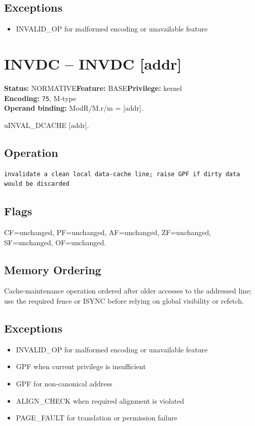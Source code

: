 \documentclass[10pt]{article}
\begin{document}
\subsection*{Exceptions}
\begin{itemize}
\item INVALID\_OP for malformed encoding or unavailable feature
\end{itemize}
\clearpage

\section{INVDC -- INVDC [addr]}
\textbf{Status:} NORMATIVE\quad \textbf{Feature:} BASE\quad \textbf{Privilege:} kernel\\
\textbf{Encoding:} \texttt{75}, M-type\\
\textbf{Operand binding:} ModR/M.r/m = [addr].

uINVAL\_DCACHE [addr].

\subsection*{Operation}
\begin{lstlisting}
invalidate a clean local data-cache line; raise GPF if dirty data would be discarded
\end{lstlisting}
\subsection*{Flags}
CF=unchanged, PF=unchanged, AF=unchanged, ZF=unchanged, SF=unchanged, OF=unchanged.
\subsection*{Memory Ordering}
Cache-maintenance operation ordered after older accesses to the addressed line; use the required fence or ISYNC before relying on global visibility or refetch.
\subsection*{Exceptions}
\begin{itemize}
\item INVALID\_OP for malformed encoding or unavailable feature
\item GPF when current privilege is insufficient
\item GPF for non-canonical address
\item ALIGN\_CHECK when required alignment is violated
\item PAGE\_FAULT for translation or permission failure
\end{itemize}
\clearpage
\end{document}
